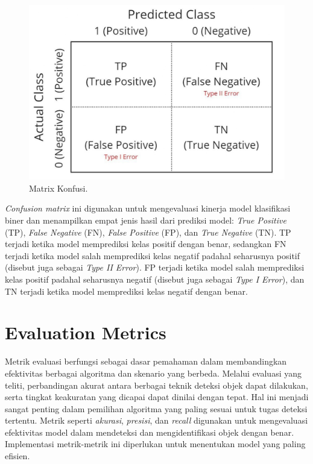 \begin{figure}[H]
  \centering
  \includegraphics[scale=0.5]{gambar/Matrix Konfusi.jpg}
  \caption{Matrix Konfusi.}
  \label{fig:confusion}
\end{figure}

\emph{Confusion matrix} ini digunakan untuk mengevaluasi kinerja model klasifikasi biner dan menampilkan empat jenis hasil dari prediksi model: \emph{True Positive} (TP), \emph{False Negative} (FN), \emph{False Positive} (FP), dan \emph{True Negative} (TN). TP terjadi ketika model memprediksi kelas positif dengan benar, sedangkan FN terjadi ketika model salah memprediksi kelas negatif padahal seharusnya positif (disebut juga sebagai \emph{Type II Error}). FP terjadi ketika model salah memprediksi kelas positif padahal seharusnya negatif (disebut juga sebagai \emph{Type I Error}), dan TN terjadi ketika model memprediksi kelas negatif dengan benar.

\section{Evaluation Metrics}
\label{sec:Evaluation Metrics}

Metrik evaluasi berfungsi sebagai dasar pemahaman dalam membandingkan efektivitas berbagai algoritma dan skenario yang berbeda. Melalui evaluasi yang teliti, perbandingan akurat antara berbagai teknik deteksi objek dapat dilakukan, serta tingkat keakuratan yang dicapai dapat dinilai dengan tepat. Hal ini menjadi sangat penting dalam pemilihan algoritma yang paling sesuai untuk tugas deteksi tertentu. Metrik seperti \emph{akurasi}, \emph{presisi}, dan \emph{recall} digunakan untuk mengevaluasi efektivitas model dalam mendeteksi dan mengidentifikasi objek dengan benar. Implementasi metrik-metrik ini diperlukan untuk menentukan model yang paling efisien.

